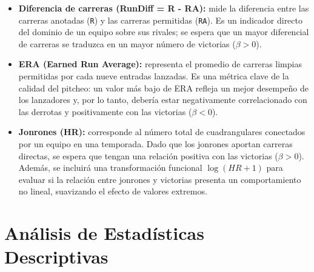 \documentclass[man,floatsintext]{apa7}
\begin{document}
\begin{itemize}
    \item \textbf{Diferencia de carreras (RunDiff = R - RA):} mide la diferencia entre las carreras anotadas (\texttt{R}) y las carreras permitidas (\texttt{RA}). Es un indicador directo del dominio de un equipo sobre sus rivales; se espera que un mayor diferencial de carreras se traduzca en un mayor número de victorias (\(\beta > 0\)). 
    \item \textbf{ERA (Earned Run Average):} representa el promedio de carreras limpias permitidas por cada nueve entradas lanzadas. Es una métrica clave de la calidad del pitcheo: un valor más bajo de ERA refleja un mejor desempeño de los lanzadores y, por lo tanto, debería estar negativamente correlacionado con las derrotas y positivamente con las victorias (\(\beta < 0\)). 
    \item \textbf{Jonrones (HR):} corresponde al número total de cuadrangulares conectados por un equipo en una temporada. Dado que los jonrones aportan carreras directas, se espera que tengan una relación positiva con las victorias (\(\beta > 0\)). Además, se incluirá una transformación funcional \(\log(HR+1)\) para evaluar si la relación entre jonrones y victorias presenta un comportamiento no lineal, suavizando el efecto de valores extremos.
\end{itemize}
\section{Análisis de Estadísticas Descriptivas}
\end{document}
